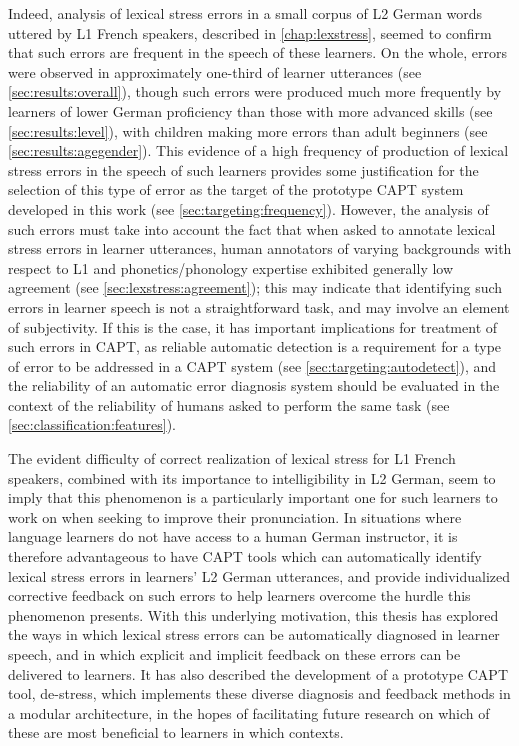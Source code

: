  
 Indeed, analysis of lexical stress errors in a small corpus of L2 German words uttered by L1 French speakers, described in \cref{chap:lexstress}, seemed to confirm that such errors are frequent in the speech of these learners. On the whole, errors were observed in approximately one-third of learner utterances (see \cref{sec:results:overall}), though such errors were produced much more frequently by learners of lower German proficiency than those with more advanced skills (see \cref{sec:results:level}), with children making more errors than adult beginners (see \cref{sec:results:agegender}). 
 This evidence of a high frequency of production of lexical stress errors in the speech of such learners provides some justification for the selection of this type of error as the target of the prototype CAPT system developed in this work (see \cref{sec:targeting:frequency}).
 However, the analysis of such errors must take into account the fact that when asked to annotate lexical stress errors in learner utterances, human annotators of varying backgrounds with respect to L1 and phonetics/phonology expertise exhibited generally low agreement (see \cref{sec:lexstress:agreement}); this may indicate that identifying such errors in learner speech is not a straightforward task, and may involve an element of subjectivity. 
 If this is the case, it has important implications for treatment of such errors in CAPT, as reliable automatic detection is a requirement for a type of error to be addressed in a CAPT system (see \cref{sec:targeting:autodetect}), and the reliability of an automatic error diagnosis system should be evaluated in the context of the reliability of humans asked to perform the same task (see \cref{sec:classification:features}).
 
 
 
 
 The evident difficulty of correct realization of lexical stress for L1 French speakers, combined with its importance to intelligibility in L2 German, seem to imply that this phenomenon is a particularly important one for such learners to work on when seeking to improve their pronunciation.
 In situations where language learners do not have access to 
a human German instructor, it is therefore advantageous to have CAPT tools which can automatically identify lexical stress errors in learners' L2 German utterances, and provide individualized corrective feedback on such errors to help learners overcome the hurdle this phenomenon presents. 
%
With this underlying motivation, this thesis has explored the ways in which lexical stress errors can be automatically diagnosed in learner speech, and in which explicit and implicit feedback on these errors can be delivered to learners. It has also described the development of a prototype CAPT tool, de-stress, which implements these diverse diagnosis and feedback methods in a modular architecture, in the hopes of facilitating future research on which of these are most beneficial to learners in which contexts.


